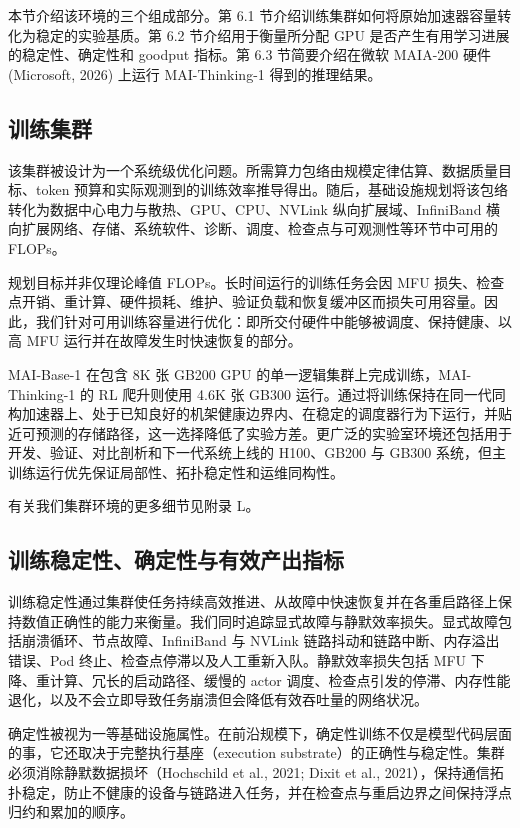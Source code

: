 \documentclass[
  10
]{article}
\begin{document}
本节介绍该环境的三个组成部分。第 6.1 节介绍训练集群如何将原始加速器容量转化为稳定的实验基质。第 6.2 节介绍用于衡量所分配 GPU 是否产生有用学习进展的稳定性、确定性和 goodput 指标。第 6.3 节简要介绍在微软 MAIA-200 硬件 (Microsoft, 2026) 上运行 MAI-Thinking-1 得到的推理结果。

\subsection{训练集群}\label{training-cluster}

该集群被设计为一个系统级优化问题。所需算力包络由规模定律估算、数据质量目标、token 预算和实际观测到的训练效率推导得出。随后，基础设施规划将该包络转化为数据中心电力与散热、GPU、CPU、NVLink 纵向扩展域、InfiniBand 横向扩展网络、存储、系统软件、诊断、调度、检查点与可观测性等环节中可用的 FLOPs。

规划目标并非仅理论峰值 FLOPs。长时间运行的训练任务会因 MFU 损失、检查点开销、重计算、硬件损耗、维护、验证负载和恢复缓冲区而损失可用容量。因此，我们针对可用训练容量进行优化：即所交付硬件中能够被调度、保持健康、以高 MFU 运行并在故障发生时快速恢复的部分。

MAI-Base-1 在包含 8K 张 GB200 GPU 的单一逻辑集群上完成训练，MAI-Thinking-1 的 RL 爬升则使用 4.6K 张 GB300 运行。通过将训练保持在同一代同构加速器上、处于已知良好的机架健康边界内、在稳定的调度器行为下运行，并贴近可预测的存储路径，这一选择降低了实验方差。更广泛的实验室环境还包括用于开发、验证、对比剖析和下一代系统上线的 H100、GB200 与 GB300 系统，但主训练运行优先保证局部性、拓扑稳定性和运维同构性。

有关我们集群环境的更多细节见附录 L。

\subsection{训练稳定性、确定性与有效产出指标}\label{training-stability-determinism-and-goodput-metrics}

训练稳定性通过集群使任务持续高效推进、从故障中快速恢复并在各重启路径上保持数值正确性的能力来衡量。我们同时追踪显式故障与静默效率损失。显式故障包括崩溃循环、节点故障、InfiniBand 与 NVLink 链路抖动和链路中断、内存溢出错误、Pod 终止、检查点停滞以及人工重新入队。静默效率损失包括 MFU 下降、重计算、冗长的启动路径、缓慢的 actor 调度、检查点引发的停滞、内存性能退化，以及不会立即导致任务崩溃但会降低有效吞吐量的网络状况。

确定性被视为一等基础设施属性。在前沿规模下，确定性训练不仅是模型代码层面的事，它还取决于完整执行基座（execution substrate）的正确性与稳定性。集群必须消除静默数据损坏（Hochschild et al., 2021; Dixit et al., 2021），保持通信拓扑稳定，防止不健康的设备与链路进入任务，并在检查点与重启边界之间保持浮点归约和累加的顺序。
\end{document}
